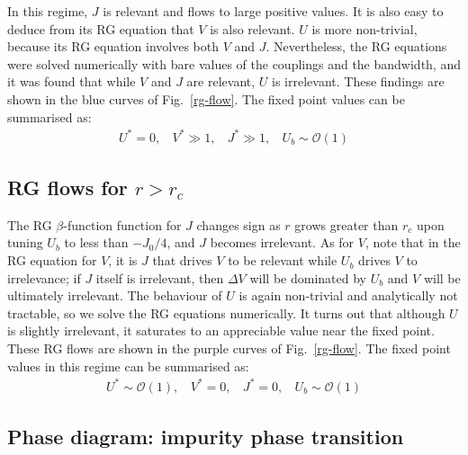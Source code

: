 \documentclass[reprint,superscriptaddress,floatfix]{revtex4-2}
\begin{document}
In this regime, \(J\) is relevant and flows to large positive values. It is also easy to deduce from its RG equation that \(V\) is also relevant. \(U\) is more non-trivial, because its RG equation involves both \(V\) and \(J\). Nevertheless, the RG equations were solved numerically with bare values of the couplings and the bandwidth, and it was found that while \(V\) and \(J\) are relevant, \(U\) is irrelevant. These findings are shown in the blue curves of Fig.~\ref{rg-flow}. The fixed point values can be summarised as:
\begin{equation}\begin{aligned}
	U^* = 0, ~ ~ ~ ~ V^* \gg 1, ~ ~ ~ ~ J^* \gg 1, ~ ~ ~ ~ U_b \sim \mathcal{O}(1)
\end{aligned}\end{equation}


\subsection{RG flows for \(r > r_c\)}

The RG \(\beta\)-function function for \(J\) changes sign as \(r\) grows greater than \(r_c\) upon tuning \(U_b\) to less than \(-J_0/4\), and \(J\) becomes irrelevant. As for \(V\), note that in the RG equation for \(V\), it is \(J\) that drives \(V\) to be relevant while \(U_b\) drives \(V\) to irrelevance; if \(J\) itself is irrelevant, then \(\Delta V\) will be dominated by \(U_b\) and \(V\) will be ultimately irrelevant. The behaviour of \(U\) is again non-trivial and analytically not tractable, so we solve the RG equations numerically. It turns out that although \(U\) is slightly irrelevant, it saturates to an appreciable value near the fixed point. These RG flows are shown in the purple curves of Fig.~\ref{rg-flow}. The fixed point values in this regime can be summarised as:
\begin{equation}\begin{aligned}
	U^* \sim \mathcal{O}(1), ~ ~ ~ ~ V^* =0, ~ ~ ~ ~ J^* =0, ~ ~ ~ ~ U_b \sim \mathcal{O}(1)
\end{aligned}\end{equation}


\subsection{Phase diagram: impurity phase transition}
\end{document}
